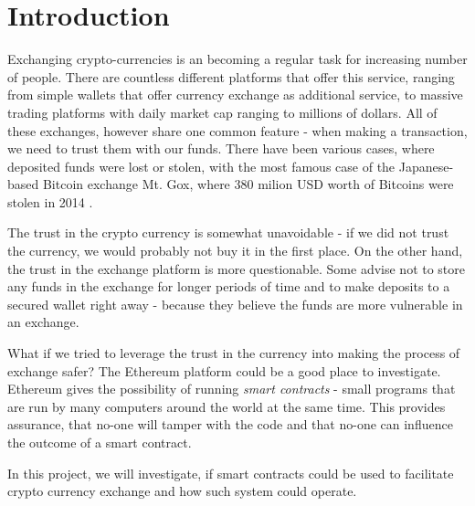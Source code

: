 \section{Introduction}
% 
Exchanging crypto-currencies is an becoming a regular task for increasing number of people. There are countless different platforms that offer this service, ranging from simple wallets that offer currency exchange as additional service, to massive trading platforms with daily market cap ranging to millions of dollars. All of these exchanges, however share one common feature - when making a transaction, we need to trust them with our funds. There have been various cases, where deposited funds were lost or stolen, with the most famous case of the Japanese-based Bitcoin exchange Mt. Gox, where 380 milion USD worth of Bitcoins were stolen in 2014 \cite{Popper2014ApparentTimes}.

The trust in the crypto currency is somewhat unavoidable - if we did not trust the currency, we would probably not buy it in the first place. On the other hand, the trust in the exchange platform is more questionable. Some advise not to store any funds in the exchange for longer periods of time and to make deposits to a secured wallet right away - because they believe the funds are more vulnerable in an exchange.
% 
% 

What if we tried to leverage the trust in the currency into making the process of exchange safer? The Ethereum platform could be a good place to investigate. Ethereum gives the possibility of running \emph{smart contracts} - small programs that are run by many computers around the world at the same time. This provides assurance, that no-one will tamper with the code and that no-one can influence the outcome of a smart contract. 
% 
% 

In this project, we will investigate, if smart contracts could be used to facilitate crypto currency exchange and how such system could operate.